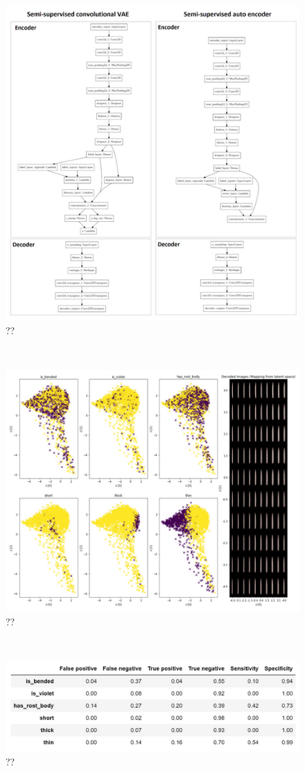 \begin{figure}[h]
	\centering
	\includegraphics[scale=0.8]{Figures/chapter04/vae}
	\decoRule
	\caption[??]{??}
	\label{fig:VAE}
\end{figure}
\\
\begin{figure}[h]
	\centering
	\includegraphics[scale=0.8]{Figures/chapter04/vae_2}
	\decoRule
	\caption[??]{??}
	\label{fig:VAE2}
\end{figure}
\\
\begin{figure}[h]
	\centering
	\includegraphics[scale=0.8]{Figures/chapter04/vae_table}
	\decoRule
	\caption[??]{??}
	\label{fig:VAEtable}
\end{figure}